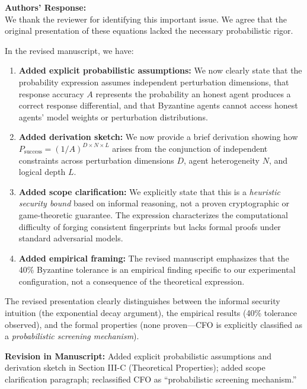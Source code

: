 \documentclass[11pt,a4paper]{article}
\newcommand{\response}[1]{%
  \noindent\textbf{\textcolor{responsecolor}{Authors' Response:}}\\
  #1\vspace{8pt}}
\newcommand{\revision}[1]{%
  \noindent\textbf{Revision in Manuscript:} #1\vspace{4pt}}
\begin{document}
\response{We thank the reviewer for identifying this important issue. We agree that the original presentation of these equations lacked the necessary probabilistic rigor.

In the revised manuscript, we have:

\begin{enumerate}[nosep]
\item \textbf{Added explicit probabilistic assumptions:} We now clearly state that the probability expression assumes independent perturbation dimensions, that response accuracy $A$ represents the probability an honest agent produces a correct response differential, and that Byzantine agents cannot access honest agents' model weights or perturbation distributions.

\item \textbf{Added derivation sketch:} We now provide a brief derivation showing how $P_{\text{success}} = (1/A)^{D \times N \times L}$ arises from the conjunction of independent constraints across perturbation dimensions $D$, agent heterogeneity $N$, and logical depth $L$.

\item \textbf{Added scope clarification:} We explicitly state that this is a \textit{heuristic security bound} based on informal reasoning, not a proven cryptographic or game-theoretic guarantee. The expression characterizes the computational difficulty of forging consistent fingerprints but lacks formal proofs under standard adversarial models.

\item \textbf{Added empirical framing:} The revised manuscript emphasizes that the 40\% Byzantine tolerance is an empirical finding specific to our experimental configuration, not a consequence of the theoretical expression.
\end{enumerate}

The revised presentation clearly distinguishes between the informal security intuition (the exponential decay argument), the empirical results (40\% tolerance observed), and the formal properties (none proven---CFO is explicitly classified as a \textit{probabilistic screening mechanism}).}

\revision{Added explicit probabilistic assumptions and derivation sketch in Section III-C (Theoretical Properties); added scope clarification paragraph; reclassified CFO as ``probabilistic screening mechanism.''}

\end{document}
